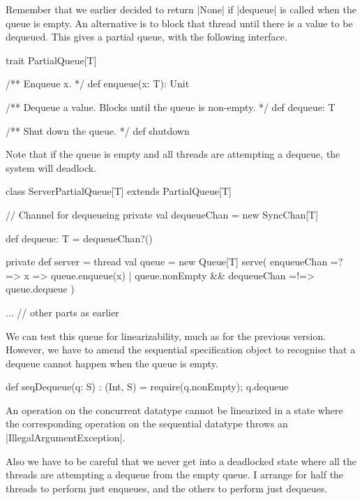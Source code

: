 

\begin{slide}

Remember that we earlier decided to return |None| if |dequeue| is called when
the queue is empty.  An alternative is to block that thread until there is a
value to be dequeued.  This gives a partial queue, with the following
interface. 

\begin{scala}
trait PartialQueue[T]{
  /** Enqueue x. */
  def enqueue(x: T): Unit

  /** Dequeue a value.  Blocks until the queue is non-empty. */
  def dequeue: T

  /** Shut down the queue. */
  def shutdown
}
\end{scala}
Note that if the queue is empty and all threads are attempting a dequeue, the
system will deadlock. 
\end{slide}


\begin{slide}

\begin{scala}
class ServerPartialQueue[T] extends PartialQueue[T]{
  // Channel for dequeueing
  private val dequeueChan = new SyncChan[T]

  def dequeue: T = dequeueChan?()

  private def server = thread{
    val queue = new Queue[T]
    serve(
      enqueueChan =?=> { x => queue.enqueue(x) }
      | queue.nonEmpty && dequeueChan =!=> queue.dequeue
    )
  }

  ... // other parts as earlier
}
\end{scala}
\end{slide}


\begin{slide}

We can test this queue for linearizability, much as for the previous version.
However, we have to amend the sequential specification object to recognise
that a dequeue cannot happen when the queue is empty. 
\begin{scala}
  def seqDequeue(q: S) : (Int, S) = {
    require(q.nonEmpty); q.dequeue
  }
\end{scala}
An operation on the concurrent datatype cannot be linearized in a state where
the corresponding operation on the sequential datatype throws an
|IllegalArgumentException|.

Also we have to be careful that we never get into a deadlocked state where all
the threads are attempting a dequeue from the empty queue.  I arrange for half
the threads to perform just enqueues, and the others to perform just dequeues.  
\end{slide}

